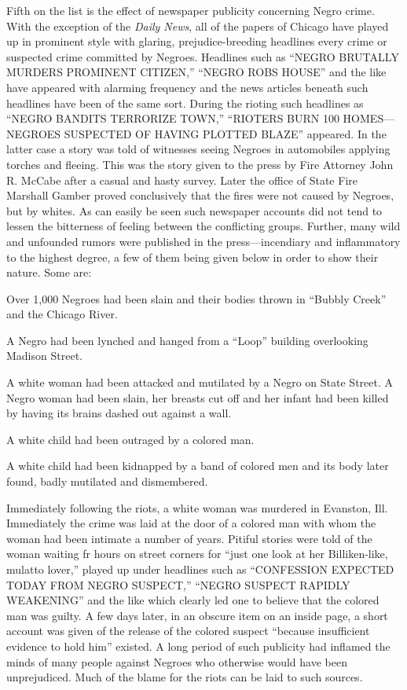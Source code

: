 \documentclass[11pt,article,oneside]{memoir}
\begin{document}
Fifth on the list is the effect of newspaper publicity concerning Negro
crime. With the exception of the \emph{Daily News}, all of the papers of
Chicago have played up in prominent style with glaring,
prejudice-breeding headlines every crime or suspected crime committed by
Negroes. Headlines such as ``NEGRO BRUTALLY MURDERS PROMINENT CITIZEN,''
``NEGRO ROBS HOUSE'' and the like have appeared with alarming frequency
and the news articles beneath such headlines have been of the same sort.
During the rioting such headlines as ``NEGRO BANDITS TERRORIZE TOWN,''
``RIOTERS BURN 100 HOMES---NEGROES SUSPECTED OF HAVING PLOTTED BLAZE''
appeared. In the latter case a story was told of witnesses seeing
Negroes in automobiles applying torches and fleeing. This was the story
given to the press by Fire Attorney John R. McCabe after a casual and
hasty survey. Later the office of State Fire Marshall Gamber proved
conclusively that the fires were not caused by Negroes, but by whites.
As can easily be seen such newspaper accounts did not tend to lessen the
bitterness of feeling between the conflicting groups. Further, many wild
and unfounded rumors were published in the press---incendiary and
inflammatory to the highest degree, a few of them being given below in
order to show their nature. Some are:

Over 1,000 Negroes had been slain and their bodies thrown in ``Bubbly
Creek'' and the Chicago River.

A Negro had been lynched and hanged from a ``Loop'' building overlooking
Madison Street.

A white woman had been attacked and mutilated by a Negro on State
Street. A Negro woman had been slain, her breasts cut off and her infant
had been killed by having its brains dashed out against a wall.

A white child had been outraged by a colored man.

A white child had been kidnapped by a band of colored men and its body
later found, badly mutilated and dismembered.

Immediately following the riots, a white woman was murdered in Evanston,
Ill. Immediately the crime was laid at the door of a colored man with
whom the woman had been intimate a number of years. Pitiful stories were
told of the woman waiting fr hours on street corners for ``just one look
at her Billiken-like, mulatto lover,'' played up under headlines such as
``CONFESSION EXPECTED TODAY FROM NEGRO SUSPECT,'' ``NEGRO SUSPECT
RAPIDLY WEAKENING'' and the like which clearly led one to believe that
the colored man was guilty. A few days later, in an obscure item on an
inside page, a short account was given of the release of the colored
suspect ``because insufficient evidence to hold him'' existed. A long
period of such publicity had inflamed the minds of many people against
Negroes who otherwise would have been unprejudiced. Much of the blame
for the riots can be laid to such sources.
\end{document}
